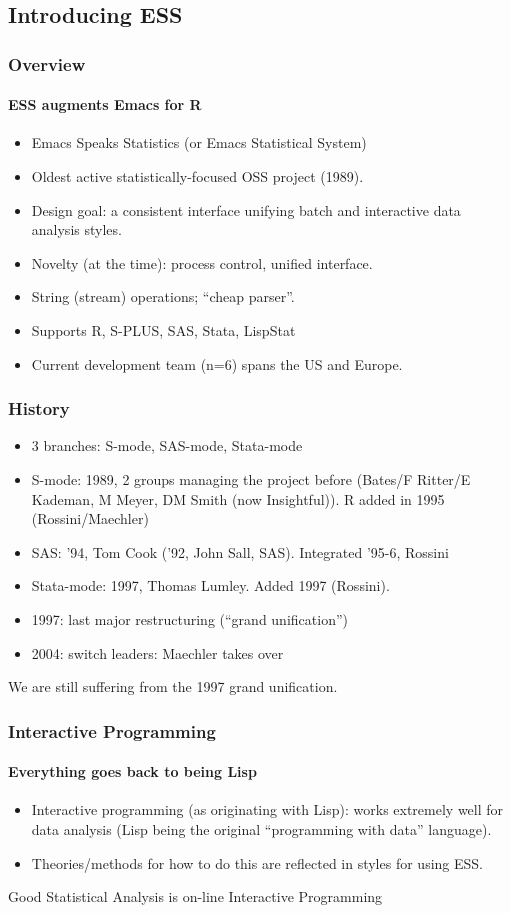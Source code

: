 \documentclass{beamer}
\begin{document}
\subsection{Introducing ESS}

\begin{frame}
  \frametitle{Overview}
  \framesubtitle{ESS augments Emacs for R}
  \begin{itemize}
  \item Emacs Speaks Statistics (or Emacs Statistical System)
  \item Oldest active statistically-focused OSS project (1989).
  \item Design goal: a consistent interface unifying batch and
    interactive data analysis styles.
  \item Novelty (at the time): process control, unified interface. 
  \item String (stream) operations; ``cheap parser''.
  \item Supports R, S-PLUS, SAS, Stata, LispStat
  \item Current development team (n=6) spans the US and Europe.
  \end{itemize}
\end{frame}

\begin{frame} \frametitle{History}
  \begin{itemize}
  \item 3 branches: S-mode, SAS-mode, Stata-mode
  \item S-mode: 1989, 2 groups managing the project before (Bates/F
    Ritter/E Kademan, M Meyer, DM Smith (now Insightful)).
    R added in 1995 (Rossini/Maechler)
  \item SAS: '94, Tom Cook ('92, John Sall, SAS).  Integrated '95-6, Rossini
  \item Stata-mode: 1997, Thomas Lumley. Added 1997 (Rossini). 
  \item 1997: last major restructuring (``grand unification'')
  \item 2004: switch leaders: Maechler takes over
  \end{itemize}
  \alert{We are still suffering from the 1997 grand unification.}
\end{frame}

\begin{frame}
  \frametitle{Interactive Programming}
  \framesubtitle{Everything goes back to being Lisp}
  \begin{itemize}
  \item Interactive programming (as originating with Lisp): works
    extremely well for data analysis (Lisp being the original
    ``programming with data'' language).
  \item Theories/methods for how to do this are reflected in styles
    for using ESS.
  \end{itemize}
  \alert{Good Statistical Analysis is on-line Interactive Programming}
\end{frame}
\end{document}
